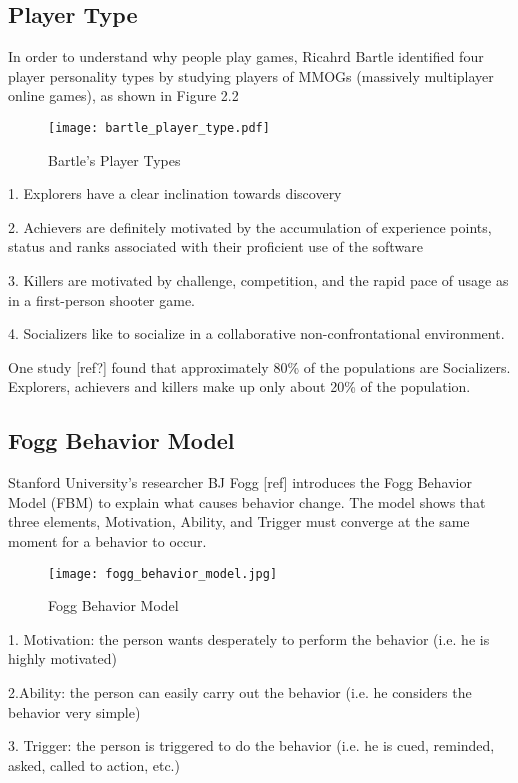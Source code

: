 \subsection{Player Type}
In order to understand why people play games, Ricahrd Bartle identified four player personality types by studying players of MMOGs (massively multiplayer online games), as shown in Figure 2.2

\begin{figure}[ht]
	\centering
		\texttt{[image: bartle\_player\_type.pdf]}
		\caption{Bartle's Player Types}
		\label{fig:player_types}
\end{figure}

1. Explorers have a clear inclination towards discovery

2. Achievers are definitely motivated by the accumulation of experience points, status and ranks associated with their proficient use of the software

3. Killers are motivated by challenge, competition, and the rapid pace of usage as in a first-person shooter game.

4. Socializers like to socialize in a collaborative non-confrontational environment.
 
One study [ref?] found that approximately 80\% of the populations are Socializers. Explorers, achievers and killers make up only about 20\% of the population.

\subsection{Fogg Behavior Model}
Stanford University's researcher BJ Fogg [ref] introduces the Fogg Behavior Model (FBM) to explain what causes behavior change. The model shows that three elements, Motivation, Ability, and Trigger must converge at the same moment for a behavior to occur. 

\begin{figure}[ht]
	\centering
		\texttt{[image: fogg\_behavior\_model.jpg]}
		\caption{Fogg Behavior Model}
		\label{fig:behavior_model}
\end{figure}

1. Motivation: the person wants desperately to perform the behavior (i.e. he is highly motivated)

2.Ability: the person can easily carry out the behavior (i.e. he considers the behavior very simple)

3. Trigger: the person is triggered to do the behavior (i.e. he is cued, reminded, asked, called to action, etc.)
 
